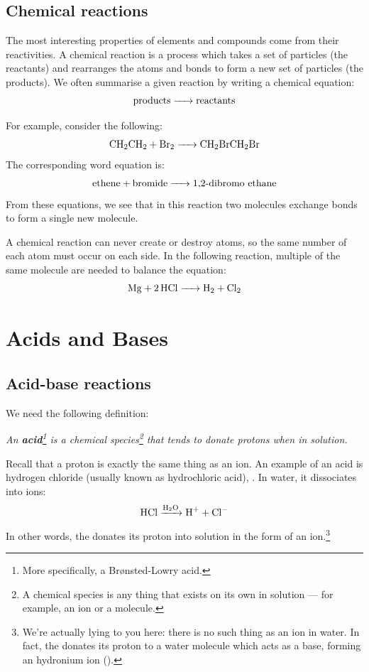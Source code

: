 \documentclass[a4paper]{memoir}
\begin{document}
\section{Chemical reactions}
The most interesting properties of elements and compounds come from their reactivities. A chemical reaction is a process which takes
a set of particles (the reactants) and rearranges the atoms and bonds to form a new set of particles (the products). We often summarise
a given reaction by writing a chemical equation:
\begin{equation}
  \ce{\text{products} -> \text{reactants}}
\end{equation}

For example, consider the following:
\begin{equation}
  \ce{CH2CH2 + Br2 -> CH2BrCH2Br}
\end{equation}
The corresponding word equation is:
\begin{equation}
  \ce{\text{ethene} + \text{bromide} -> \text{1,2-dibromo ethane}}
\end{equation}
From these equations, we see that in this reaction two molecules exchange bonds to form a single new molecule.

A chemical reaction can never create or destroy atoms, so the same number of each atom must occur on each side. In the following reaction,
multiple of the same molecule are needed to balance the equation:
\begin{equation}
  \ce{Mg + 2HCl -> H2 + Cl2}
\end{equation}

\chapter{Acids and Bases}
\section{Acid-base reactions}
We need the following definition:

{\itshape
  An \textbf{acid}\footnote{More specifically, a Br{\o}nsted-Lowry acid.} is a chemical species\footnote{A chemical species is any thing that
  exists on its own in solution --- for example, an ion or a molecule.} that tends to donate protons when in solution.
}

Recall that a proton is exactly the same thing as an  ion. An example of an acid is hydrogen chloride (usually known as hydrochloric acid), . In
water, it dissociates into ions:
\begin{equation}
  \ce{HCl ->[H2O] H+ + Cl-}
\end{equation}
In other words, the  donates its proton into solution in the form of an  ion.\footnote{We're actually lying to you here: there is no such thing
as an  ion in water. In fact, the  donates its proton to a water molecule which acts as a base, forming an hydronium ion ().}
\end{document}
